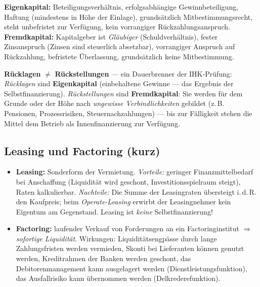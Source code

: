 \documentclass[11pt, a4paper]{article}
\begin{document}
\begin{merksatz}[title={\bfseries Eigenkapital vs. Fremdkapital --- typische Merkmale}]
\textbf{Eigenkapital:} Beteiligungsverhältnis, erfolgsabhängige Gewinnbeteiligung, Haftung
(mindestens in Höhe der Einlage), grundsätzlich Mitbestimmungsrecht, steht unbefristet zur
Verfügung, kein vorrangiger Rückzahlungsanspruch.\\[0.3em]
\textbf{Fremdkapital:} Kapitalgeber ist \emph{Gläubiger} (Schuldverhältnis), fester
Zinsanspruch (Zinsen sind steuerlich absetzbar), vorrangiger Anspruch auf Rückzahlung,
befristete Überlassung, grundsätzlich keine Mitbestimmung.
\end{merksatz}

\begin{achtung}
\textbf{Rücklagen} $\neq$ \textbf{Rückstellungen} --- ein Dauerbrenner der IHK-Prüfung:
\emph{Rücklagen} sind \textbf{Eigenkapital} (einbehaltene Gewinne --- das Ergebnis der
Selbstfinanzierung). \emph{Rückstellungen} sind \textbf{Fremdkapital}: Sie werden für
dem Grunde oder der Höhe nach \emph{ungewisse Verbindlichkeiten} gebildet (z.\,B.
Pensionen, Prozessrisiken, Steuernachzahlungen) --- bis zur Fälligkeit stehen die
Mittel dem Betrieb als Innenfinanzierung zur Verfügung.
\end{achtung}

\subsection{Leasing und Factoring (kurz)}

\begin{itemize}
  \item \textbf{Leasing:} Sonderform der Vermietung. \emph{Vorteile:} geringer
    Finanzmittelbedarf bei Anschaffung (Liquidität wird geschont, Investitionsspielraum
    steigt), Raten kalkulierbar. \emph{Nachteile:} Die Summe der Leasingraten übersteigt
    i.\,d.\,R. den Kaufpreis; beim \emph{Operate-Leasing} erwirbt der Leasingnehmer kein
    Eigentum am Gegenstand. Leasing ist \emph{keine} Selbstfinanzierung!
  \item \textbf{Factoring:} laufender Verkauf von Forderungen an ein Factoringinstitut
    $\Rightarrow$ \emph{sofortige Liquidität}. Wirkungen: Liquiditätsengpässe durch lange
    Zahlungsfristen werden vermieden, Skonti bei Lieferanten können genutzt werden,
    Kreditrahmen der Banken werden geschont, das Debitorenmanagement kann ausgelagert
    werden (Dienstleistungsfunktion), das Ausfallrisiko kann übernommen werden
    (Delkrederefunktion).
\end{itemize}
\end{document}
